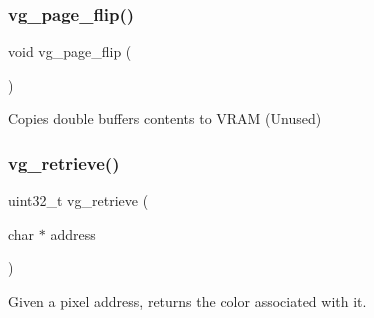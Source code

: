 \subsubsection{\texorpdfstring{vg\+\_\+page\+\_\+flip()}{vg\_page\_flip()}}
{\footnotesize\ttfamily void vg\+\_\+page\+\_\+flip (\begin{DoxyParamCaption}{ }\end{DoxyParamCaption})}



Copies double buffer\textquotesingle{}s contents to V\+R\+AM (Unused) 

\mbox{\label{group__video_ga8ff5bbb05f1cb62f5958290a45723571}} 
\subsubsection{\texorpdfstring{vg\+\_\+retrieve()}{vg\_retrieve()}}
{\footnotesize\ttfamily uint32\+\_\+t vg\+\_\+retrieve (\begin{DoxyParamCaption}\item[{char $\ast$}]{address }\end{DoxyParamCaption})}



Given a pixel address, returns the color associated with it. 



